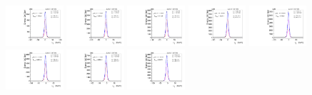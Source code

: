 \begin{figure}[htb]
\ContinuedFloat
\centering
\includegraphics[width=0.19\textwidth]{plots/Appendix_Recoil_Fits/WmpMC_PF_5TeV_2G/pfu1fit_0.pdf}
\includegraphics[width=0.19\textwidth]{plots/Appendix_Recoil_Fits/WmpMC_PF_5TeV_2G/pfu1fit_1.pdf}
\includegraphics[width=0.19\textwidth]{plots/Appendix_Recoil_Fits/WmpMC_PF_5TeV_2G/pfu1fit_2.pdf}
\includegraphics[width=0.19\textwidth]{plots/Appendix_Recoil_Fits/WmpMC_PF_5TeV_2G/pfu1fit_3.pdf}
\includegraphics[width=0.19\textwidth]{plots/Appendix_Recoil_Fits/WmpMC_PF_5TeV_2G/pfu1fit_4.pdf}
\includegraphics[width=0.19\textwidth]{plots/Appendix_Recoil_Fits/WmpMC_PF_5TeV_2G/pfu1fit_5.pdf}
\includegraphics[width=0.19\textwidth]{plots/Appendix_Recoil_Fits/WmpMC_PF_5TeV_2G/pfu1fit_6.pdf}
\includegraphics[width=0.19\textwidth]{plots/Appendix_Recoil_Fits/WmpMC_PF_5TeV_2G/pfu1fit_7.pdf}

\end{figure}
